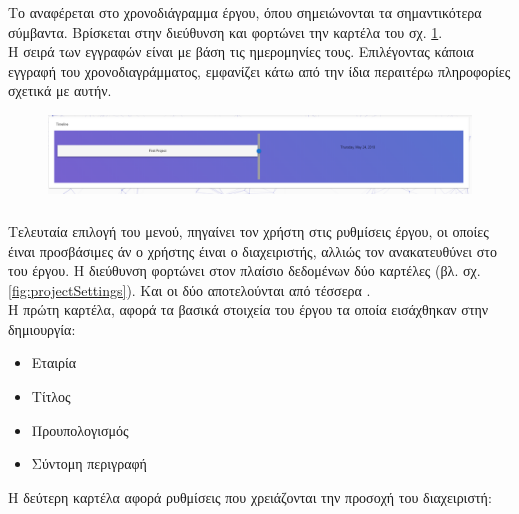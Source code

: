 \subsubsection*{}
\pSpace Το  αναφέρεται στο χρονοδιάγραμμα έργου, όπου σημειώνονται τα σημαντικότερα σύμβαντα. Βρίσκεται στην διεύθυνση  και φορτώνει την καρτέλα του σχ. \ref{fig:projectTimeline}.\\
\pSpace Η σειρά των εγγραφών είναι με βάση τις ημερομηνίες τους. Επιλέγοντας κάποια εγγραφή του χρονοδιαγράμματος, εμφανίζει κάτω από την ίδια περαιτέρω πληροφορίες σχετικά με αυτήν.

\begin{figure}[!htb]
\includegraphics[width=\linewidth]{images/projectTimeline.png}
\caption{}
\label{fig:projectTimeline}
\end{figure}

\subsubsection*{}
\pSpace Τελευταία επιλογή του μενού, πηγαίνει τον χρήστη στις ρυθμίσεις έργου, οι οποίες έιναι προσβάσιμες άν ο χρήστης έιναι ο διαχειριστής, αλλιώς τον ανακατευθύνει στο  του έργου. Η διεύθυνση  φορτώνει στον πλαίσιο δεδομένων δύο καρτέλες (βλ. σχ. \ref{fig:projectSettings}). Και οι δύο αποτελούνται από τέσσερα .\\
\pSpace Η πρώτη καρτέλα, αφορά τα βασικά στοιχεία του έργου τα οποία εισάχθηκαν στην δημιουργία:\\
\begin{itemize}
	\item Εταιρία
	\item Τίτλος
	\item Προυπολογισμός
	\item Σύντομη περιγραφή
\end{itemize}

\pSpace Η δεύτερη καρτέλα αφορά ρυθμίσεις που χρειάζονται την προσοχή του διαχειριστή:\\

